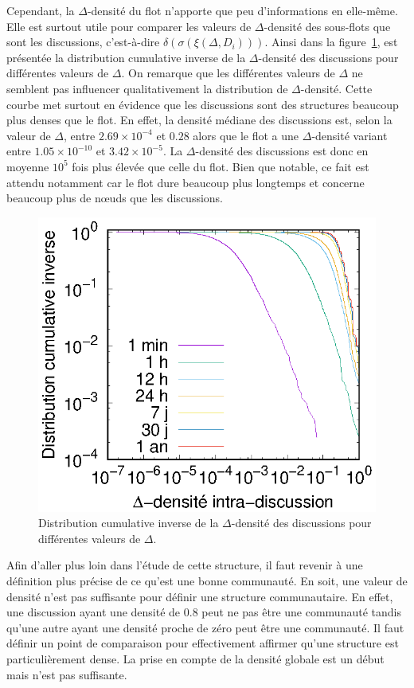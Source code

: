 Cependant, la $\Delta$-densité du flot n'apporte que peu d'informations en elle-même.
Elle est surtout utile pour comparer les valeurs de $\Delta$-densité des sous-flots que sont les discussions, c'est-à-dire  $\delta(\sigma(\xi(\Delta,D_i)))$.
Ainsi dans la figure~\ref{fig:intra_dens_discussion}, est présentée la distribution cumulative inverse de la $\Delta$-densité des discussions pour différentes valeurs de $\Delta$.
On remarque que les différentes valeurs de $\Delta$ ne semblent pas influencer qualitativement la distribution de $\Delta$-densité.
Cette courbe met surtout en évidence que les discussions sont des structures beaucoup plus denses que le flot.
En effet, la densité médiane des discussions est, selon la valeur de $\Delta$, entre $2.69 \times 10^{-4}$ et $0.28$ alors que le flot a une $\Delta$-densité variant entre $1.05  \times 10^{-10}$ et $3.42 \times 10^{-5}$.
La $\Delta$-densité des discussions est donc en moyenne $10^{5}$ fois plus élevée que celle du flot.
Bien que notable, ce fait est attendu notamment car le flot dure beaucoup plus longtemps et concerne beaucoup plus de n\oe{}uds que les discussions.
\begin{figure}
\centering
	\includegraphics[width=0.4\linewidth]{img/mailing/delta.eps}

\caption{Distribution cumulative inverse de la $\Delta$-densité des discussions pour différentes valeurs de $\Delta$.}
\label{fig:intra_dens_discussion}
\end{figure}

Afin d'aller plus loin dans l'étude de cette structure, il faut revenir à une définition plus précise de ce qu'est une bonne communauté.
En soit, une valeur de densité n'est pas suffisante pour définir une structure communautaire.
En effet, une discussion ayant une densité de $0.8$ peut  ne pas être une communauté tandis qu'une autre ayant une densité proche de zéro peut être une communauté.
Il faut définir un point de comparaison pour effectivement affirmer qu'une structure est particulièrement dense.
La prise en compte de la densité globale est un début mais n'est pas suffisante.

